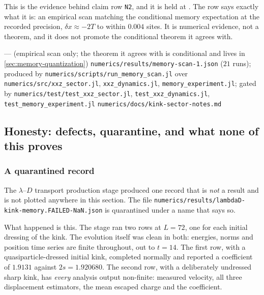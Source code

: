 This is the evidence behind claim row \texttt{N2}, and it is held at
\statusSketch. The row says exactly what it is: an empirical scan matching the
conditional memory expectation at the recorded precision, $\delta x \approx
-2T$ to within $0.004$ sites. It is numerical evidence, not a theorem, and it
does not promote the conditional theorem it agrees with.

{--- (empirical scan only; the theorem it agrees with is conditional and lives
 in \cref{sec:memory-quantization})}
{\texttt{numerics/\allowbreak{}results/\allowbreak{}memory-\allowbreak{}scan-\allowbreak{}1.json} ($21$ runs); produced by
 \texttt{numerics/\allowbreak{}scripts/\allowbreak{}run\_\allowbreak{}memory\_\allowbreak{}scan.jl} over
 \texttt{numerics/\allowbreak{}src/\allowbreak{}xxz\_\allowbreak{}sector.jl}, \texttt{xxz\_\allowbreak{}dynamics.jl},
 \texttt{memory\_\allowbreak{}experiment.jl}; gated by
 \texttt{numerics/\allowbreak{}test/\allowbreak{}test\_\allowbreak{}xxz\_\allowbreak{}sector.jl},
 \texttt{test\_\allowbreak{}xxz\_\allowbreak{}dynamics.jl}, \texttt{test\_\allowbreak{}memory\_\allowbreak{}experiment.jl}}
{\texttt{numerics/\allowbreak{}docs/\allowbreak{}kink-\allowbreak{}sector-\allowbreak{}notes.md}}

\subsection{Honesty: defects, quarantine, and what none of this proves}\label{sec:numerics-honesty}

\subsubsection*{A quarantined record}

The $\lambda$--$D$ transport production stage produced one record that is
\emph{not} a result and is not plotted anywhere in this section. The file
\texttt{numerics/\allowbreak{}results/\allowbreak{}lambdaD-\allowbreak{}kink-\allowbreak{}memory.FAILED-\allowbreak{}NaN.json} is quarantined
under a name that says so.

What happened is this. The stage ran two rows at $L=72$, one for each initial
dressing of the kink. The evolution itself was clean in both: energies, norms
and position time series are finite throughout, out to $t=14$. The first row,
with a quasiparticle-dressed initial kink, completed normally and reported a
coefficient of $1.9131$ against $2s=1.920680$. The second row, with a
deliberately undressed sharp kink, has \emph{every} analysis output
non-finite: measured velocity, all three displacement estimators, the mean
escaped charge and the coefficient.

